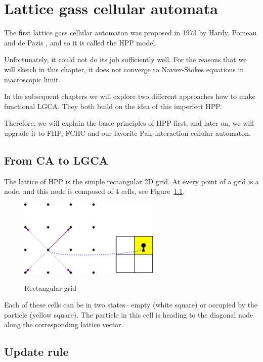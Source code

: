 \chapter{Lattice gass cellular automata}
The first lattice gass cellular automaton was proposed in 1973 by Hardy, Pomeau and de Pazis \cite{hpp}, and so it is called the HPP model.

Unfortunately, it could not do its job sufficiently well. For the reasons that we will sketch in this chapter, it does not converge to Navier-Stokes equations in macroscopic limit.

\bigskip

In the subsequent chapters we will explore two different approaches how to make functional LGCA. They both build on the idea of this imperfect HPP.

Therefore, we will explain the basic principles of HPP first, and later on, we will upgrade it to FHP, FCHC and our favorite Pair-interaction cellular automaton.

\section{From CA to LGCA}

The lattice of HPP is the simple rectangular 2D grid. At every point of a grid is a node, and this node is composed of 4 cells, see Figure~\ref{rectangular}.

\begin{figure}[htbp]
 \centering
 \includegraphics[width=0.6\textwidth]{./img/hppnode}
 \label{rectangular}
 \caption{Rectangular grid}
\end{figure}

Each of these cells can be in two states-- empty (white square) or occupied by the particle (yellow square).
The particle in this cell is heading to the diagonal node along the corresponding lattice vector.

\section{Update rule}

